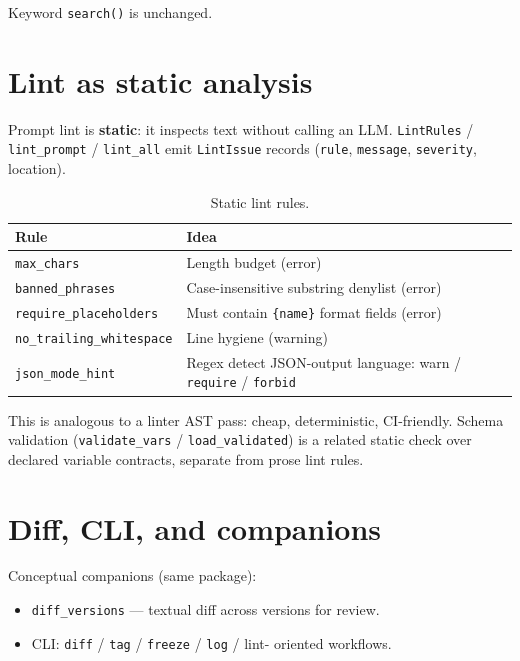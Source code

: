\documentclass[11pt,a4paper]{article}
\newcommand{\code}[1]{\texttt{#1}}
\begin{document}
Keyword \code{search()} is unchanged.

\section{Lint as static analysis}

Prompt lint is \textbf{static}: it inspects text without calling an LLM.
\code{LintRules} / \code{lint\_prompt} / \code{lint\_all} emit
\code{LintIssue} records (\code{rule}, \code{message}, \code{severity},
location).

\begin{table}[htbp]
  \centering
  \begin{tabular}{@{}lp{}@{}}
    \toprule
    \textbf{Rule} & \textbf{Idea} \\
    \midrule
    \code{max\_chars}
      & Length budget (error) \\
    \code{banned\_phrases}
      & Case-insensitive substring denylist (error) \\
    \code{require\_placeholders}
      & Must contain \texttt{\{name\}} format fields (error) \\
    \code{no\_trailing\_whitespace}
      & Line hygiene (warning) \\
    \code{json\_mode\_hint}
      & Regex detect JSON-output language: warn /
        \code{require} / \code{forbid} \\
    \bottomrule
  \end{tabular}
  \caption{Static lint rules.}
  \label{tab:lint-rules}
\end{table}

This is analogous to a linter AST pass: cheap, deterministic, CI-friendly.
Schema validation (\code{validate\_vars} / \code{load\_validated}) is a related
static check over declared variable contracts, separate from prose lint rules.

\section{Diff, CLI, and companions}

Conceptual companions (same package):
\begin{itemize}[leftmargin=*]
  \item \code{diff\_versions} --- textual diff across versions for review.
  \item CLI: \code{diff} / \code{tag} / \code{freeze} / \code{log} / lint-
        oriented workflows.
\end{itemize}
\end{document}
